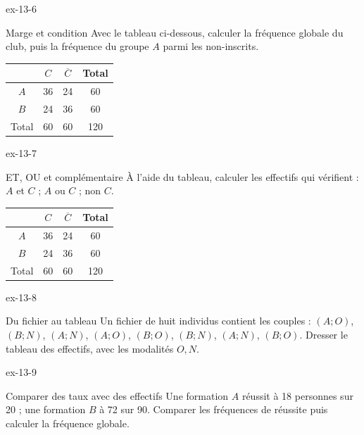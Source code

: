 \clearpage{}
\begin{blocLivre}{ex-13-6}
\begin{exercice}[2]{Marge et condition}
Avec le tableau ci-dessous, calculer la fréquence globale du club, puis la fréquence du groupe $A$ parmi les non-inscrits.\begin{center}\renewcommand{\arraystretch}{1.35}\begin{tabular}{c|ccc}\toprule
 & $C$ & $\overline C$ & Total\\\midrule
$A$ & 36 & 24 & 60\\
$B$ & 24 & 36 & 60\\
Total & 60 & 60 & 120\\
\bottomrule\end{tabular}\end{center}
\end{exercice}
\end{blocLivre}
\begin{blocLivre}{ex-13-7}
\begin{exercice}[2]{ET, OU et complémentaire}
À l’aide du tableau, calculer les effectifs qui vérifient : $A$ et $C$ ; $A$ ou $C$ ; non $C$.\begin{center}\renewcommand{\arraystretch}{1.35}\begin{tabular}{c|ccc}\toprule
 & $C$ & $\overline C$ & Total\\\midrule
$A$ & 36 & 24 & 60\\
$B$ & 24 & 36 & 60\\
Total & 60 & 60 & 120\\
\bottomrule\end{tabular}\end{center}
\label{fig-ex-13-7}
\end{exercice}
\end{blocLivre}
\begin{blocLivre}{ex-13-8}
\begin{exercice}[2]{Du fichier au tableau}
Un fichier de huit individus contient les couples : $(A;O)$, $(B;N)$, $(A;N)$, $(A;O)$, $(B;O)$, $(B;N)$, $(A;N)$, $(B;O)$. Dresser le tableau des effectifs, avec les modalités $O,N$.
\end{exercice}
\end{blocLivre}
\begin{blocLivre}{ex-13-9}
\begin{exercice}[2]{Comparer des taux avec des effectifs}
Une formation $A$ réussit à 18 personnes sur 20 ; une formation $B$ à 72 sur 90. Comparer les fréquences de réussite puis calculer la fréquence globale.
\end{exercice}
\end{blocLivre}
